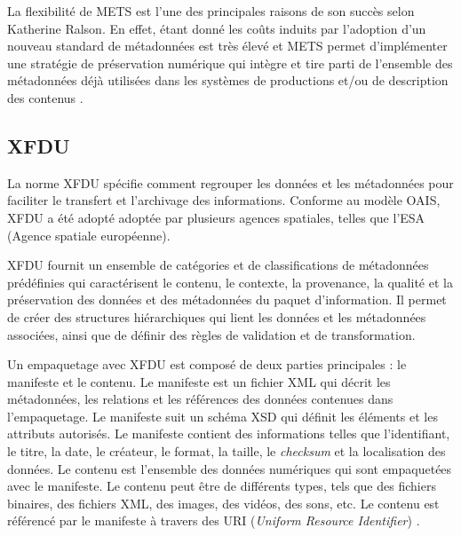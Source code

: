 \documentclass[12pt,a4paper]{article} %
\begin{document}
La flexibilité de METS est l'une des principales raisons de son succès selon Katherine Ralson. En effet, étant donné les coûts induits par l'adoption d'un nouveau standard de métadonnées est très élevé et METS permet d'implémenter une stratégie de préservation numérique qui intègre et tire parti de l'ensemble des métadonnées déjà utilisées dans les systèmes de productions et/ou de description des contenus \autocite{ralson_mets_2013}. 


\subsection{XFDU}
La norme XFDU spécifie comment regrouper les données et les métadonnées pour faciliter le transfert et l'archivage des informations. Conforme au modèle OAIS, XFDU a été adopté adoptée par plusieurs agences spatiales, telles que l'ESA (Agence spatiale européenne). 

XFDU fournit un ensemble de catégories et de classifications de métadonnées prédéfinies qui caractérisent le contenu, le contexte, la provenance, la qualité et la préservation des données et des métadonnées du paquet d'information. Il permet de créer des structures hiérarchiques qui lient les données et les métadonnées associées, ainsi que de définir des règles de validation et de transformation. 

Un empaquetage avec XFDU est composé de deux parties principales : le manifeste et le contenu. Le manifeste est un fichier XML qui décrit les métadonnées, les relations et les références des données contenues dans l'empaquetage. Le manifeste suit un schéma XSD qui définit les éléments et les attributs autorisés. Le manifeste contient des informations telles que l'identifiant, le titre, la date, le créateur, le format, la taille, le \textit{checksum} et la localisation des données. Le contenu est l'ensemble des données numériques qui sont empaquetées avec le manifeste. Le contenu peut être de différents types, tels que des fichiers binaires, des fichiers XML, des images, des vidéos, des sons, etc. Le contenu est référencé par le manifeste à travers des URI (\textit{Uniform Resource Identifier}) \autocite{dunckley_using_2010}.
\end{document}
